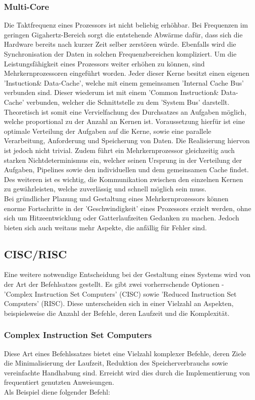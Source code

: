 \subsubsection{Multi-Core}
Die Taktfrequenz eines Prozessors ist nicht beliebig erhöhbar. Bei Frequenzen im geringen Gigahertz-Bereich sorgt die entstehende Abwärme dafür, dass sich die Hardware bereits nach kurzer Zeit selber zerstören würde. Ebenfalls wird die Synchronisation der Daten in solchen Frequenzbereichen kompliziert. Um die Leistungsfähigkeit eines Prozessors weiter erhöhen zu können, sind Mehrkernprozessoren eingeführt worden. Jeder dieser Kerne besitzt einen eigenen 'Instuction\& Data-Cache', welche mit einem gemeinsamen 'Internal Cache Bus' verbunden sind. Dieser wiederum ist mit einem 'Common Instruction\& Data-Cache' verbunden, welcher die Schnittstelle zu dem 'System Bus' darstellt.\\
Theoretisch ist somit eine Vervielfachung des Durchsatzes an Aufgaben möglich, welche proportional zu der Anzahl an Kernen ist. Voraussetzung hierfür ist eine optimale Verteilung der Aufgaben auf die Kerne, sowie eine parallele Verarbeitung, Anforderung und Speicherung von Daten. Die Realisierung hiervon ist jedoch nicht trivial. Zudem führt ein Mehrkernprozessor gleichzeitig auch starken Nichtdeterminismus ein, welcher seinen Ursprung in der Verteilung der Aufgaben, Pipelines sowie den individuellen und dem gemeinsamen Cache findet. Des weiteren ist es wichtig, die Kommunikation zwischen den einzelnen Kernen zu gewährleisten, welche zuverlässig und schnell möglich sein muss.\\
Bei gründlicher Planung und Gestaltung eines Mehrkernprozessors können enorme Fortschritte in der 'Geschwindigkeit' eines Prozessors erzielt werden, ohne sich um Hitzeentwicklung oder Gatterlaufzeiten Gedanken zu machen. Jedoch bieten sich auch weitaus mehr Aspekte, die anfällig für Fehler sind.

\subsection{CISC/RISC}\label{2.5}
Eine weitere notwendige Entscheidung bei der Gestaltung eines Systems wird von der Art der Befehlsatzes gestellt. Es gibt zwei vorherrschende Optionen - 'Complex Instruction Set Computers' (CISC) sowie 'Reduced Instruction Set Computers' (RISC). Diese unterscheiden sich in einer Vielzahl an Aspekten, beispielsweise die Anzahl der Befehle, deren Laufzeit und die Komplexität.

\subsubsection{Complex Instruction Set Computers}
Diese Art eines Befehlssatzes bietet eine Vielzahl komplexer Befehle, deren Ziele die Minimalisierung der Laufzeit, Reduktion des Speicherverbrauchs sowie vereinfachte Handhabung sind. Erreicht wird dies durch die Implementierung von frequentiert genutzten Anweisungen.\\
Als Beispiel diene folgender Befehl:\\


